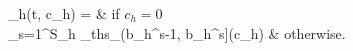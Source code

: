 \documentclass{article}
\begin{document}
	\begin{numcases}{\pi_h(t, c_h) = }
	\infty & if $c_h = 0$ \\
	\sum_{s=1}^{S_h} \pi_{ths}_{\left(b_h^{s-1}, b_h^s\right]}(c_h) &  otherwise.
	\end{numcases}
\end{document}
